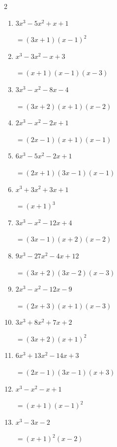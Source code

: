 \begin{multicols}{2}
\begin{enumerate}
        $=(3x+2)(3x-2)(x+1)$

  \item $3x^{3}-5x^{2}+x+1$

        $=(3x+1)(x-1) ^{ 2 }$

\columnbreak %

  \item $x^{3}-3x^{2}-x+3$

        $=(x+1)(x-1)(x-3)$

  \item $3x^{3}-x^{2}-8x-4$

        $=(3x+2)(x+1)(x-2)$

  \item $2x^{3}-x^{2}-2x+1$

        $=(2x-1)(x+1)(x-1)$

  \item $6x^{3}-5x^{2}-2x+1$

        $=(2x+1)(3x-1)(x-1)$

  \item $x^{3}+3x^{2}+3x+1$

        $=(x+1) ^{ 3 }$

\columnbreak %

\resetques

  \item $3x^{3}-x^{2}-12x+4$

        $=(3x-1)(x+2)(x-2)$

  \item $9x^{3}-27x^{2}-4x+12$

        $=(3x+2)(3x-2)(x-3)$

  \item $2x^{3}-x^{2}-12x-9$

        $=(2x+3)(x+1)(x-3)$

  \item $3x^{3}+8x^{2}+7x+2$

        $=(3x+2)(x+1) ^{ 2 }$

  \item $6x^{3}+13x^{2}-14x+3$

        $=(2x-1)(3x-1)(x+3)$

\columnbreak %

  \item $x^{3}-x^{2}-x+1$

        $=(x+1)(x-1) ^{ 2 }$

  \item $x^{3}-3x-2$

        $=(x+1) ^{ 2 }(x-2)$


\end{enumerate}
\end{multicols}
